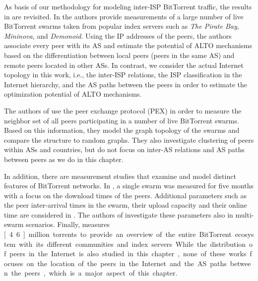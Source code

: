 As basis of our methodology for modeling inter-ISP BitTorrent traffic, the results in \cite{Hossfeld2011} are revisited. In \cite{Hossfeld2011} the authors provide measurements of a large number of live BitTorrent swarms taken from popular index servers such as \emph{The Pirate Bay}, \emph{Mininova}, and \emph{Demonoid}. Using the IP addresses of the peers, the authors associate every peer with its AS and estimate the potential of ALTO mechanisms based on the differentiation between local peers (peers in the same AS) and remote peers located in other ASs. In contrast, we consider the actual Internet topology in this work, i.e., the inter-ISP relations, the ISP classification in the Internet hierarchy, and the AS paths between the peers in order to estimate the optimization potential of ALTO mechanisms.

The authors of \cite{Kryczka2011} use the peer exchange protocol (PEX) in order to measure the neighbor set of all peers participating in a number of live BitTorrent swarms. Based on this information, they model the graph topology of the swarms and compare the structure to random graphs. They also investigate clustering of peers within ASs and countries, but do not focus on inter-AS relations and AS paths between peers as we do in this chapter.

In addition, there are measurement studies that examine and model distinct features of BitTorrent networks. In \cite{Izal2004}, a single swarm was measured for five months with a focus on the download times of the peers. Additional parameters such as the peer inter-arrival times in the swarm, their upload capacity and their online time are considered in \cite{Pouwelse2005}. The authors of \cite{Guo2005} investigate these parameters also in multi-swarm scenarios. Finally, \cite{Zhang2010} measures \unit[4.6]{million} torrents to provide an overview of the entire BitTorrent ecosystem with its different communities and index servers.
While the distribution of peers in the Internet is also studied in this chapter, none of these works focuses on the location of the peers in the Internet and the AS paths between the peers, which is a major aspect of this chapter.

